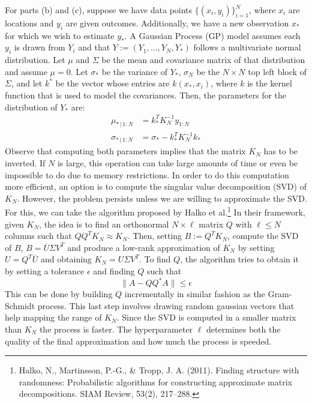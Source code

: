 \documentclass[11pt, english]{article}
\begin{document}
\begin{multicols}{2}
For parts (b) and (c), suppose we have data points $\{(x_{i}, y_{i})\}_{i=1}^{N}$, where $x_{i}$ are locations and $y_{i}$ are given outcomes. Additionally, we have a new observation $x_{*}$ for which we wish to estimate $y_{*}$. A Gaussian Process (GP) model assumes each $y_{i}$ is drawn from $Y_{i}$ and that $Y := (Y_{1}, \ldots, Y_{N}, Y_{*})$ follows a multivariate normal distribution. Let $\mu$ and $\Sigma$ be the mean and covariance matrix of that distribution and assume $\mu = 0$. Let $\sigma_{*}$ be the variance of $Y_{*}$, $\sigma_{N}$ be the $N \times N$ top left block of $\Sigma$, and let $k^{*}$ be the vector whose entries are $k(x_{*}, x_{i})$, where $k$ is the kernel function that is used to model the covariances. Then, the parameters for the distribution of $Y_{*}$ are:
	\begin{align*}
		\mu_{*\,|\,1:N}		&=	k_{*}^{T}K_{N}^{-1}y_{1:N}	\\
		\sigma_{*\,|\,1:N}	&=	\sigma_{*} - k_{*}^{T}K_{N}^{-1}k_{*}
	\end{align*}
Observe that computing both parameters implies that the matrix $K_{N}$ has to be inverted. If $N$ is large, this operation can take large amounts of time or even be impossible to do due to memory restrictions. In order to do this computation more efficient, an option is to compute the singular value decomposition (SVD) of $K_{N}$. However, the problem persists unless we are willing to approximate the SVD. For this, we can take the algorithm proposed by Halko et al.\footnote{Halko, N., Martinsson, P.-G., \& Tropp, J. A. (2011). Finding structure with randomness: Probabilistic algorithms for constructing approximate matrix decompositions. SIAM Review, 53(2), 217–288.} In their  framework, given $K_{N}$, the idea is to find an orthonormal $N \times \ell$ matrix $Q$ with $\ell \leq N$ columns such that $QQ^{T}K_{N} \approx K_{N}$. Then, setting $B := Q^{T}K_{N}$, compute the SVD of $B$, $B = \overline{U}\Sigma V^{T}$ and produce a low-rank approximation of $K_{N}$ by setting $U = Q^{T}\overline{U}$ and obtaining $K_{N} = U\Sigma V^{T}$. To find $Q$, the algorithm tries to obtain it by setting a tolerance $\epsilon$ and finding $Q$ such that
	$$\|A - QQ^{*}A\| \leq \epsilon$$
This can be done by building $Q$ incrementally in similar fashion as the Gram-Schmidt process. This last step involves drawing random gaussian vectors that help mapping the range of $K_{N}$. Since the SVD is computed in a smaller matrix than $K_{N}$ the process is faster. The hyperparameter $\ell$ determines both the quality of the final approximation and how much the process is speeded.


\end{multicols}
\end{document}
